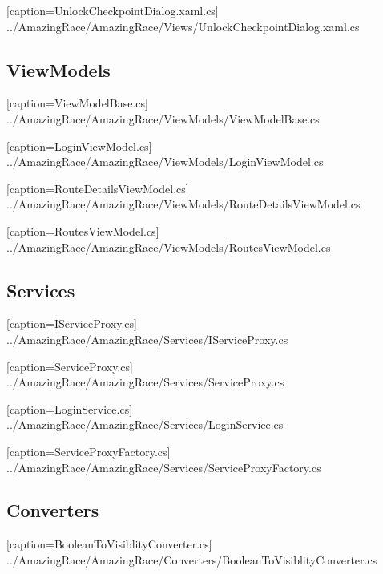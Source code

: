 \documentclass[a4paper,ngerman]{scrartcl}
\begin{document}

[caption=UnlockCheckpointDialog.xaml.cs]
{../AmazingRace/AmazingRace/Views/UnlockCheckpointDialog.xaml.cs}


\subsection{ViewModels}

[caption=ViewModelBase.cs]
{../AmazingRace/AmazingRace/ViewModels/ViewModelBase.cs}


[caption=LoginViewModel.cs]
{../AmazingRace/AmazingRace/ViewModels/LoginViewModel.cs}


[caption=RouteDetailsViewModel.cs]
{../AmazingRace/AmazingRace/ViewModels/RouteDetailsViewModel.cs}


[caption=RoutesViewModel.cs]
{../AmazingRace/AmazingRace/ViewModels/RoutesViewModel.cs}


\subsection{Services}

[caption=IServiceProxy.cs]
{../AmazingRace/AmazingRace/Services/IServiceProxy.cs}


[caption=ServiceProxy.cs]
{../AmazingRace/AmazingRace/Services/ServiceProxy.cs}


[caption=LoginService.cs]
{../AmazingRace/AmazingRace/Services/LoginService.cs}


[caption=ServiceProxyFactory.cs]
{../AmazingRace/AmazingRace/Services/ServiceProxyFactory.cs}


\subsection{Converters}

[caption=BooleanToVisiblityConverter.cs]
{../AmazingRace/AmazingRace/Converters/BooleanToVisiblityConverter.cs}
\end{document}
